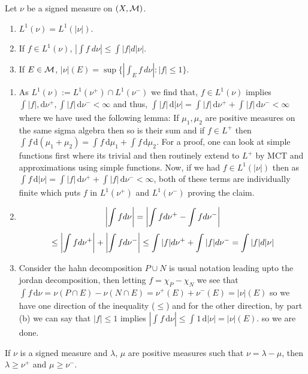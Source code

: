 \documentclass[12pt,a4paper]{article}
\begin{document}
\begin{problem}\label{prob:3-3}
Let $\nu$ be a signed measure on $(X, \mathcal{M})$.
\begin{enumerate}[label=\alph*.]
    \item $L^{1}(\nu)=L^{1}(|\nu|)$.
    \item If $f\in L^{1}(\nu)$, $|\int f~d\nu|\le\int|f|d|\nu|$.
    \item If $E\in\mathcal{M}$, $|\nu|(E) = \sup \{ |\int_E f\, d\nu| : |f| \le 1 \}$.
\end{enumerate}
\end{problem}
\begin{solution}
\begin{enumerate}[label=\alph*.]
\item As $L^1(\nu):=L^1(\nu^+)\cap L^1(\nu^-)$ we find that, $f\in L^1(\nu)$ implies $ \int_{}^{}|f|,\mathrm{d}\nu^+, \int_{}^{}|f|\,\mathrm{d}\nu^-<\infty$ and thus, $ \int_{}^{}|f|\,\mathrm{d}|\nu|= \int_{}^{}|f|\,\mathrm{d}\nu^++ \int_{}^{}|f|\,\mathrm{d}\nu^-<\infty$ where we have used the following lemma: If $\mu_1,\mu_2$ are positive measures on the same sigma algebra then so is their sum and if $f\in L^+$ then $ \int_{}^{}f\,\mathrm{d}(\mu_1+\mu_2)= \int_{}^{}f\,\mathrm{d}\mu_1+ \int_{}^{}f\,\mathrm{d}\mu_2$. 
For a proof, one can look at simple functions first where its trivial and then routinely extend to $L^+$ by MCT and approximations using simple functions. 
Now, if we had $f\in L^1(|\nu|)$ then as $ \int_{}^{}f\,\mathrm{d}|\nu|=\int_{}^{}|f|\,\mathrm{d}\nu^++ \int_{}^{}|f|\,\mathrm{d}\nu^-<\infty$, both of these terms are individually finite which puts $f$ in $L^1(\nu^+)$ and $L^1(\nu^-)$ proving the claim.
\item \[
    \qty|\int fd\nu|=\qty|\int fd\nu^+-\int fd\nu^-|
\]
\[\leq\qty|\int fd\nu^+|+\qty|\int fd\nu^-|\leq\int|f|d\nu^++\int|f|d\nu^-=\int|f|d|\nu|
\]
 
\item Consider the hahn decomposition $P\cup N$ is usual notation leading upto the jordan decomposition, then letting $f=\chi_P-\chi_N$ we see that $ \int_{}^{}f\,\mathrm{d}\nu=\nu(P\cap E)-\nu(N\cap E)=\nu^+(E)+\nu^-(E)=|\nu|(E)$ so we have one direction of the inequality ($\leq$) and for the other direction, by part (b) we can say that $|f|\leq 1$ implies $|\int_{}^{}f\,\mathrm{d}\nu|\leq \int_{}^{}1\,\mathrm{d}|\nu|=|\nu|(E).$ so we are done.
\end{enumerate}
\end{solution}
\begin{problem}\label{prob:3-4}
If $\nu$ is a signed measure and $\lambda$, $\mu$ are positive measures such that $\nu=\lambda-\mu$, then $\lambda\ge\nu^{+}$ and $\mu\ge\nu^{-}$.
\end{problem}
\end{document}
